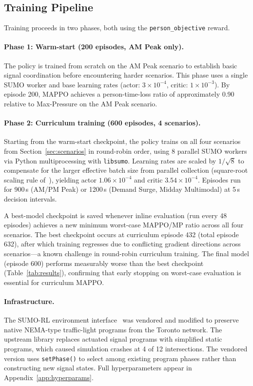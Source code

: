 \documentclass{article}
\begin{document}
\subsection{Training Pipeline}
\label{sec:training}

Training proceeds in two phases, both using the \texttt{person\_objective} reward.

\paragraph{Phase 1: Warm-start (200 episodes, AM Peak only).}
The policy is trained from scratch on the AM Peak scenario to establish basic signal coordination before encountering harder scenarios. This phase uses a single SUMO worker and base learning rates (actor: $3 \times 10^{-4}$, critic: $1 \times 10^{-3}$). By episode 200, MAPPO achieves a person-time-loss ratio of approximately 0.90 relative to Max-Pressure on the AM Peak scenario.

\paragraph{Phase 2: Curriculum training (600 episodes, 4 scenarios).}
Starting from the warm-start checkpoint, the policy trains on all four scenarios from Section~\ref{sec:scenarios} in round-robin order, using 8 parallel SUMO workers via Python multiprocessing with \texttt{libsumo}. Learning rates are scaled by $1/\sqrt{8}$ to compensate for the larger effective batch size from parallel collection (square-root scaling rule of~\citet{hoffer_train_longer}), yielding actor $1.06 \times 10^{-4}$ and critic $3.54 \times 10^{-4}$. Episodes run for 900\,s (AM/PM Peak) or 1200\,s (Demand Surge, Midday Multimodal) at 5\,s decision intervals.

A best-model checkpoint is saved whenever inline evaluation (run every 48 episodes) achieves a new minimum worst-case MAPPO/MP ratio across all four scenarios. The best checkpoint occurs at curriculum episode 432 (total episode 632), after which training regresses due to conflicting gradient directions across scenarios---a known challenge in round-robin curriculum training. The final model (episode 600) performs measurably worse than the best checkpoint (Table~\ref{tab:results}), confirming that early stopping on worst-case evaluation is essential for curriculum MAPPO.

\paragraph{Infrastructure.} The SUMO-RL environment interface~\cite{sumo_rl} was vendored and modified to preserve native NEMA-type traffic-light programs from the Toronto network. The upstream library replaces actuated signal programs with simplified static programs, which caused simulation crashes at 4 of 12 intersections. The vendored version uses \texttt{setPhase()} to select among existing program phases rather than constructing new signal states. Full hyperparameters appear in Appendix~\ref{app:hyperparams}.
\end{document}
